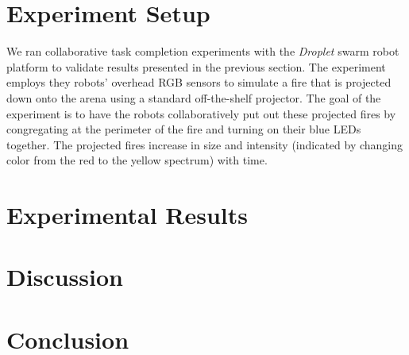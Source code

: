 \documentclass[conference]{ieeeconf}
\begin{document}
\section{Experiment Setup}\label{sec:expsetup}
We ran collaborative task completion experiments with the \emph{Droplet} swarm robot platform to validate results presented in the previous section. The experiment employs they robots' overhead RGB sensors to simulate a fire that is projected down onto the arena using a standard off-the-shelf projector. The goal of the experiment is to have the robots collaboratively put out these projected fires by congregating at the perimeter of the fire and turning on their blue LEDs together. The projected fires increase in size and intensity (indicated by changing color from the red to the yellow spectrum) with time.



\section{Experimental Results}\label{sec:expresults}




\section{Discussion}\label{sec:disc}




\section{Conclusion}\label{sec:conc}





\end{document}

